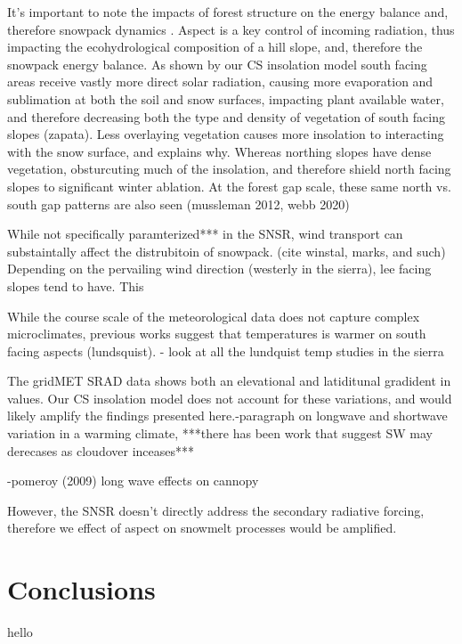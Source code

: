 It's important to note the impacts of forest structure on the energy balance and, therefore snowpack dynamics \citep{rothForestImpactsSnow2017}. Aspect is a key control of incoming radiation, thus impacting the ecohydrological composition of a hill slope, and, therefore the snowpack energy balance. As shown by our CS insolation model south facing areas receive vastly more direct solar radiation, causing more evaporation and sublimation at both the soil and snow surfaces, impacting plant available water, and therefore decreasing both the type and density of vegetation of south facing slopes (zapata). Less overlaying vegetation causes more insolation to interacting with the snow surface, and explains why. Whereas northing slopes have dense vegetation, obsturcuting much of the insolation, and therefore shield north facing slopes to significant winter ablation. At the forest gap scale, these same north vs. south gap patterns are also seen (mussleman 2012, webb 2020)


While not specifically paramterized*** in the SNSR, wind transport can substaintally affect the distrubitoin of snowpack. (cite winstal, marks, and such) Depending on the pervailing wind direction (westerly in the sierra), lee facing slopes tend to have. This 



While the course scale of the meteorological data does not capture complex microclimates, previous works suggest that temperatures is warmer on south facing aspects (lundsquist). - look at all the lundquist temp studies in the sierra



The gridMET SRAD data shows both an elevational and latiditunal gradident in values. Our CS insolation model does not account for these variations, and would likely amplify the findings presented here.-paragraph on longwave and shortwave variation in a warming climate, ***there has been work that suggest SW may derecases as cloudover inceases***

-pomeroy (2009) long wave effects on cannopy

However, the SNSR doesn’t directly address the secondary radiative forcing, therefore we effect of aspect on snowmelt processes would be amplified.

\hypertarget{ch2-conclusions}{\section{Conclusions}\label{ch2-conclusions}}
hello

\clearpage



